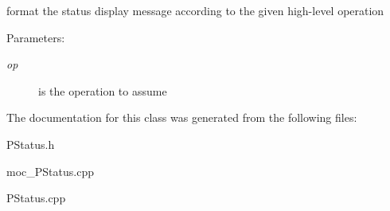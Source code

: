 format the status display message according to the given high-level operation \begin{Desc}
\item[Parameters:]
\begin{description}
\item[{\em op}]is the operation to assume \end{description}
\end{Desc}


The documentation for this class was generated from the following files:\begin{CompactItemize}
\item 
PStatus.h\item 
moc\_\-PStatus.cpp\item 
PStatus.cpp\end{CompactItemize}
